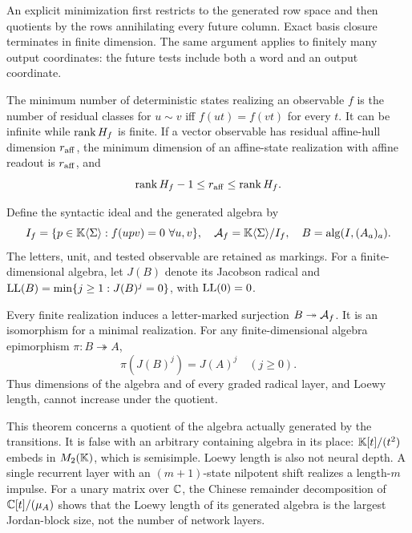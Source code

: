 An explicit minimization first restricts to the generated row space and then quotients by the rows annihilating every future column. Exact basis closure terminates in finite dimension. The same argument applies to finitely many output coordinates: the future tests include both a word and an output coordinate.

\begin{proposition}\label{I:S:prop:types}
The minimum number of deterministic states realizing an observable $f$ is the number of residual classes for $u\sim v$ iff $f(ut)=f(vt)$ for every $t$. It can be infinite while $\operatorname{rank} H_f$ is finite. If a vector observable has residual affine-hull dimension $r_{\rm aff}$, the minimum dimension of an affine-state realization with affine readout is $r_{\rm aff}$, and
\[
 \operatorname{rank} H_f-1\le r_{\rm aff}\le\operatorname{rank} H_f.
\]
\end{proposition}


Define the syntactic ideal and the generated algebra by
\[
 I_f=\{p\in\SK\langle\Sigma\rangle:f(upv)=0\ \forall u,v\},\quad
 \ScA_f=\SK\langle\Sigma\rangle/I_f,\quad B=\Salg(I,(A_a)_a).
\]
The letters, unit, and tested observable are retained as markings. For a finite-dimensional algebra, let $J(B)$ denote its Jacobson radical and $\operatorname{LL}(B)=\min\{j\ge1:J(B)^j=0\}$, with $\operatorname{LL}(0)=0$.

\begin{theorem}\label{I:S:thm:marked}
Every finite realization induces a letter-marked surjection $B\twoheadrightarrow\mathcal A_f$. It is an isomorphism for a minimal realization. For any finite-dimensional algebra epimorphism $\pi:B\twoheadrightarrow A$,
\[
 \pi(J(B)^j)=J(A)^j\quad(j\ge0).
\]
Thus dimensions of the algebra and of every graded radical layer, and Loewy length, cannot increase under the quotient.
\end{theorem}


\begin{remark}
This theorem concerns a quotient of the algebra actually generated by the transitions. It is false with an arbitrary containing algebra in its place: $\mathbb K[t]/(t^2)$ embeds in $M_2(\mathbb K)$, which is semisimple. Loewy length is also not neural depth. A single recurrent layer with an $(m+1)$-state nilpotent shift realizes a length-$m$ impulse. For a unary matrix over $\mathbb C$, the Chinese remainder decomposition of $\mathbb C[t]/(\mu_A)$ shows that the Loewy length of its generated algebra is the largest Jordan-block size, not the number of network layers.
\end{remark}

